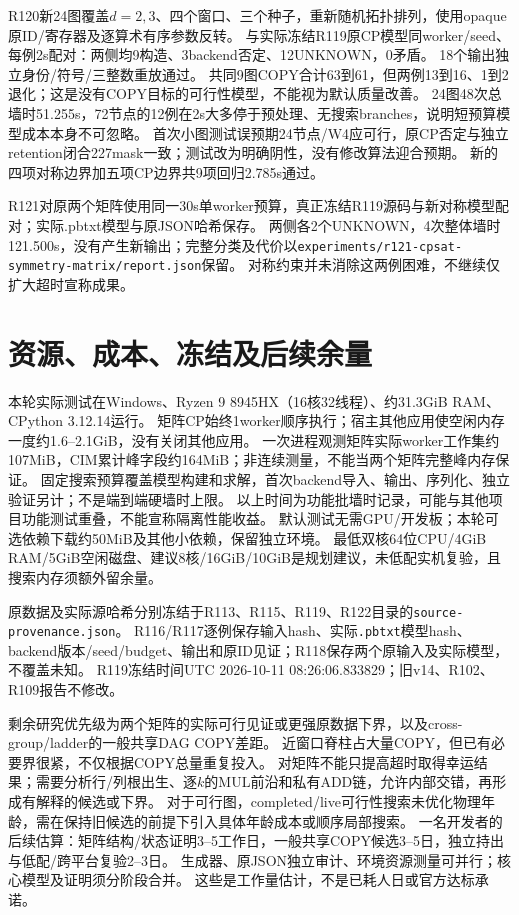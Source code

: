 \documentclass[UTF8,11pt,a4paper]{ctexart}
\begin{document}
R120新24图覆盖$d=2,3$、四个窗口、三个种子，重新随机拓扑排列，使用opaque原ID/寄存器及逐算术有序参数反转。
与实际冻结R119原CP模型同worker/seed、每例2s配对：两侧均9构造、3backend否定、12UNKNOWN，0矛盾。
18个输出独立身份/符号/三整数重放通过。
共同9图COPY合计63到61，但两例13到16、1到2退化；这是没有COPY目标的可行性模型，不能视为默认质量改善。
24图48次总墙时51.255s，72节点的12例在2s大多停于预处理、无搜索branches，说明短预算模型成本本身不可忽略。
首次小图测试误预期24节点/W4应可行，原CP否定与独立retention闭合227mask一致；测试改为明确阴性，没有修改算法迎合预期。
新的四项对称边界加五项CP边界共9项回归2.785s通过。

R121对原两个矩阵使用同一30s单worker预算，真正冻结R119源码与新对称模型配对；实际.pbtxt模型与原JSON哈希保存。
两侧各2个UNKNOWN，4次整体墙时121.500s，没有产生新输出；完整分类及代价以\texttt{experiments/r121-cpsat-symmetry-matrix/report.json}保留。
对称约束并未消除这两例困难，不继续仅扩大超时宣称成果。

\section{资源、成本、冻结及后续余量}
本轮实际测试在Windows、Ryzen 9 8945HX（16核32线程）、约31.3GiB RAM、CPython 3.12.14运行。
矩阵CP始终1worker顺序执行；宿主其他应用使空闲内存一度约1.6--2.1GiB，没有关闭其他应用。
一次进程观测矩阵实际worker工作集约107MiB，CIM累计峰字段约164MiB；非连续测量，不能当两个矩阵完整峰内存保证。
固定搜索预算覆盖模型构建和求解，首次backend导入、输出、序列化、独立验证另计；不是端到端硬墙时上限。
以上时间为功能批墙时记录，可能与其他项目功能测试重叠，不能宣称隔离性能收益。
默认测试无需GPU/开发板；本轮可选依赖下载约50MiB及其他小依赖，保留独立环境。
最低双核64位CPU/4GiB RAM/5GiB空闲磁盘、建议8核/16GiB/10GiB是规划建议，未低配实机复验，且搜索内存须额外留余量。

原数据及实际源哈希分别冻结于R113、R115、R119、R122目录的\texttt{source-provenance.json}。
R116/R117逐例保存输入hash、实际\texttt{.pbtxt}模型hash、backend版本/seed/budget、输出和原ID见证；R118保存两个原输入及实际模型，不覆盖未知。
R119冻结时间UTC 2026-10-11 08:26:06.833829；旧v14、R102、R109报告不修改。

剩余研究优先级为两个矩阵的实际可行见证或更强原数据下界，以及cross-group/ladder的一般共享DAG COPY差距。
近窗口脊柱占大量COPY，但已有必要界很紧，不仅根据COPY总量重复投入。
对矩阵不能只提高超时取得幸运结果；需要分析行/列根出生、逐$k$的MUL前沿和私有ADD链，允许内部交错，再形成有解释的候选或下界。
对于可行图，completed/live可行性搜索未优化物理年龄，需在保持旧候选的前提下引入具体年龄成本或顺序局部搜索。
一名开发者的后续估算：矩阵结构/状态证明3--5工作日，一般共享COPY候选3--5日，独立持出与低配/跨平台复验2--3日。
生成器、原JSON独立审计、环境资源测量可并行；核心模型及证明须分阶段合并。
这些是工作量估计，不是已耗人日或官方达标承诺。
\end{document}
